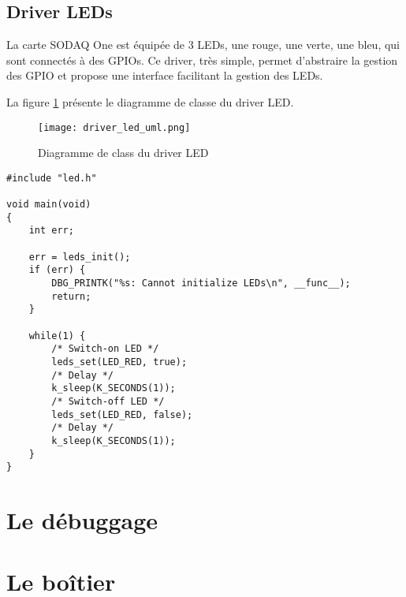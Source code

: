 \subsection{Driver LEDs}

La carte SODAQ One est équipée de 3 LEDs, une rouge, une verte, une bleu, qui sont connectés à des GPIOs. Ce driver, très simple, permet d'abstraire la gestion des GPIO et propose une interface facilitant la gestion des LEDs.

La figure \ref{fig:driver_led_uml} présente le diagramme de classe du driver LED.

\begin{figure}[htb]
\centering 
\texttt{[image: driver\_led\_uml.png]} 
\caption{Diagramme de class du driver LED}
\label{fig:driver_led_uml}
\end{figure}

\begin{lstlisting}[style=CStyle]
#include "led.h"

void main(void)
{
	int err;

	err = leds_init();
	if (err) {
		DBG_PRINTK("%s: Cannot initialize LEDs\n", __func__);
		return;
	}
	
	while(1) {
		/* Switch-on LED */
		leds_set(LED_RED, true);
		/* Delay */
		k_sleep(K_SECONDS(1));
		/* Switch-off LED */
		leds_set(LED_RED, false);
		/* Delay */
		k_sleep(K_SECONDS(1));		
	}
}
\end{lstlisting}

\section{Le débuggage}

\todo{}

\section{Le boîtier}

\todo{}
